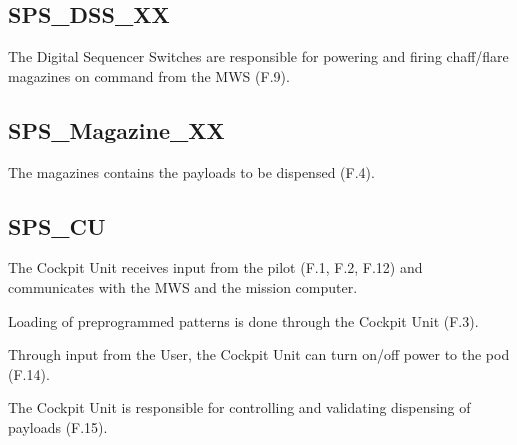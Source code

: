\documentclass[Main]{subfiles}
\begin{document}
\subsection{SPS\_DSS\_XX}
The Digital Sequencer Switches are responsible for powering and firing chaff/flare magazines on command from the MWS (F.9).

\subsection{SPS\_Magazine\_XX}
The magazines contains the payloads to be dispensed (F.4).

\subsection{SPS\_CU}
The Cockpit Unit receives input from the pilot (F.1, F.2, F.12) and communicates with the MWS and the mission computer.

Loading of preprogrammed patterns is done through the Cockpit Unit (F.3).

Through input from the User, the Cockpit Unit can turn on/off power to the pod (F.14).

The Cockpit Unit is responsible for controlling and validating dispensing of payloads (F.15).
\end{document}
